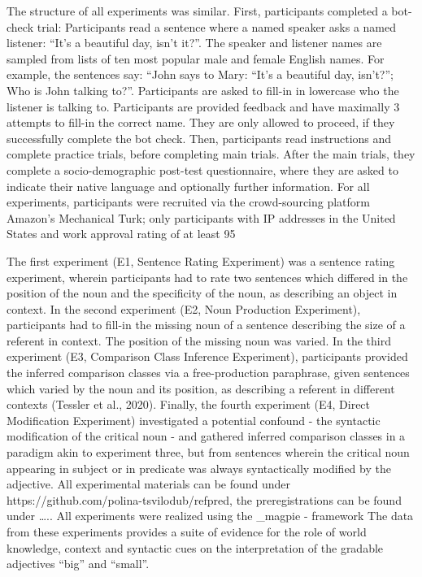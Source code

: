 The structure of all experiments was similar. First, participants completed a bot-check trial: Participants read a sentence where a named speaker asks a named listener: “It’s a beautiful day, isn’t it?”. The speaker and listener names are sampled from lists of ten most popular male and female English names. For example, the sentences say: “John says to Mary: “It’s a beautiful day, isn’t?”; Who is John talking to?”.  Participants are asked to fill-in in lowercase who the listener is talking to. Participants are provided feedback and have maximally 3 attempts to fill-in the correct name. They are only allowed to proceed, if they successfully complete the bot check. Then, participants read instructions and complete practice trials, before completing main trials. After the main trials, they complete a socio-demographic post-test questionnaire, where they are asked to indicate their native language and optionally further information. 
For all experiments, participants were recruited via the crowd-sourcing platform Amazon’s Mechanical Turk; only participants with IP addresses in the United States and work approval rating of at least 95%

The first experiment (E1, Sentence Rating Experiment) was a sentence rating experiment, wherein participants had to rate two sentences which differed in the position of the noun and the specificity of the noun, as describing an object in context. 
In the second experiment (E2, Noun Production Experiment), participants had to fill-in the missing noun of a sentence describing the size of a referent in context. The position of the missing noun was varied. 
In the third experiment (E3, Comparison Class Inference Experiment), participants provided the inferred comparison classes via a free-production paraphrase, given sentences which varied by the noun and its position, as describing a referent in different contexts (Tessler et al., 2020). 
Finally, the fourth experiment (E4, Direct Modification Experiment) investigated a potential confound - the syntactic modification of the critical noun - and gathered inferred comparison classes in a paradigm akin to experiment three, but from sentences wherein the critical noun appearing in subject or in predicate was always syntactically modified by the adjective. 
All experimental materials can be found under https://github.com/polina-tsvilodub/refpred, the preregistrations can be found under ….. All experiments were realized using the \_magpie - framework %
The data from these experiments provides a suite of evidence for the role of world knowledge, context and syntactic cues on the interpretation of the gradable adjectives “big” and “small”.  

